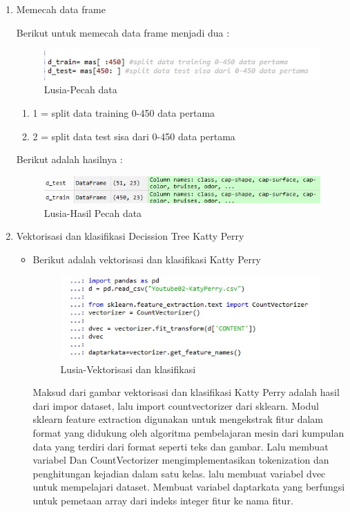 \begin{enumerate}
\item Memecah data frame
	\par Berikut untuk memecah data frame menjadi dua :
	
		\begin{figure}[ht]
		\centering
		\includegraphics[scale=0.5]{figures/n2a.jpg}
		\caption{Lusia-Pecah data}
		\label{contoh}
		\end{figure}
	
	\begin{enumerate}
	\item 1 = split data training 0-450 data pertama
	\item 2 = split data test sisa dari 0-450 data pertama
	\end{enumerate}
	
	\par Berikut adalah hasilnya :
	
		\begin{figure}[ht]
		\centering
		\includegraphics[scale=0.5]{figures/n2b.jpg}
		\caption{Lusia-Hasil Pecah data}
		\label{contoh}
		\end{figure}
		
\item Vektorisasi dan klasifikasi Decission Tree Katty Perry
	\begin{itemize}
	\item Berikut adalah vektorisasi dan klasifikasi Katty Perry
		\begin{figure}[ht]
		\centering
		\includegraphics[scale=0.5]{figures/n3a.jpg}
		\caption{Lusia-Vektorisasi dan klasifikasi}
		\label{contoh}
		\end{figure}
	\par Maksud dari gambar vektorisasi dan klasifikasi Katty Perry adalah hasil dari impor dataset, lalu import countvectorizer dari sklearn. Modul sklearn feature extraction digunakan untuk mengekstrak fitur dalam format yang didukung oleh algoritma pembelajaran mesin dari kumpulan data yang terdiri dari format seperti teks dan gambar. Lalu membuat variabel Dan CountVectorizer mengimplementasikan tokenization dan penghitungan kejadian dalam satu kelas. lalu membuat variabel dvec untuk mempelajari dataset. Membuat variabel daptarkata yang berfungsi untuk pemetaan array dari indeks integer fitur ke nama fitur. 
	

\end{itemize}
\end{enumerate}
